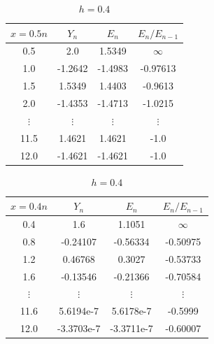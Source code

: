 \documentclass[10pt,a4paper,notitlepage]{article}
\begin{document}
\begin{table}[H]
\parbox{.45\linewidth}{
\centering
\begin{tabular}{|c|c|c|c|}
\hline
$x=0.5n$ & $Y_{n}$ & $E_{n}$ & $E_{n}/E_{n-1}$\\ 
\hline 0.5 & 2.0 & 1.5349 & $\infty$ \\ 1.0 & -1.2642 & -1.4983 & -0.97613\\ 1.5 & 1.5349 & 1.4403 & -0.9613\\ 2.0 & -1.4353 & -1.4713 & -1.0215\\ $\vdots$ & $\vdots$ & $\vdots$ & $\vdots$\\ 11.5 & 1.4621 & 1.4621 & -1.0\\ 12.0 & -1.4621 & -1.4621 & -1.0\\ \hline \end{tabular}

\caption{$h=0.5$}
}
\hfill
\parbox{.45\linewidth}{
\centering
\begin{tabular}{|c|c|c|c|}
\hline
$x=0.4n$ & $Y_{n}$ & $E_{n}$ & $E_{n}/E_{n-1}$\\ 
\hline
0.4 & 1.6 & 1.1051 & $\infty$ \\ 0.8 & -0.24107 & -0.56334 & -0.50975\\ 1.2 & 0.46768 & 0.3027 & -0.53733\\ 1.6 & -0.13546 & -0.21366 & -0.70584\\ $\vdots$ & $\vdots$ & $\vdots$ & $\vdots$\\ 11.6 & 5.6194e-7 & 5.6178e-7 & -0.5999\\ 12.0 & -3.3703e-7 & -3.3711e-7 & -0.60007\\ \hline \end{tabular}
\caption{$h=0.4$}
}
\end{table}
\end{document}
